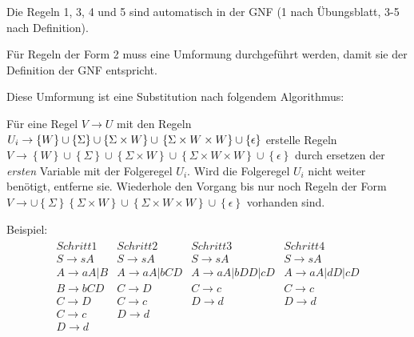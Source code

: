 \documentclass{article}
\begin{document}
Die Regeln 1, 3, 4 und 5 sind automatisch in der GNF (1 nach Übungsblatt, 3-5 nach Definition).

Für Regeln der Form 2 muss eine Umformung durchgeführt werden, damit sie der Definition der GNF entspricht.

Diese Umformung ist eine Substitution nach folgendem Algorithmus:

Für eine Regel $V \rightarrow U$ mit den Regeln $U_i \rightarrow \left\{W\right\}\cup\left\{\Sigma\right\}\cup\left\{\Sigma\times W\right\}\cup\\\left\{\Sigma \times W \times W\right\}\cup\left\{\epsilon\right\}$ erstelle Regeln $V \rightarrow \left\{W\right\}\cup\left\{\Sigma\right\}\cup\left\{\Sigma\times W\right\}\cup\left\{\Sigma \times W \times W\right\}\cup\left\{\epsilon\right\}$ durch ersetzen der \textit{ersten} Variable mit der Folgeregel $U_i$. Wird die Folgeregel $U_i$ nicht weiter benötigt, entferne sie.
Wiederhole den Vorgang bis nur noch Regeln der Form $V \rightarrow \cup\left\{\Sigma\right\}\left\{\Sigma\times W\right\}\cup\left\{\Sigma \times W \times W\right\}\cup\left\{\epsilon\right\}$ vorhanden sind.

Beispiel:
\begin{align*}
\begin{array}{llll}
Schritt 1 & Schritt 2 & Schritt 3 & Schritt 4 \\
\hline
S \rightarrow sA     & S \rightarrow sA       & S \rightarrow sA            & S \rightarrow sA \\
A \rightarrow aA | B & A \rightarrow aA | bCD & A \rightarrow aA | bDD | cD & A \rightarrow aA | dD | cD \\
B \rightarrow bCD    & C \rightarrow D        & C \rightarrow c             & C \rightarrow c \\
C \rightarrow D      & C \rightarrow c        & D \rightarrow d             & D \rightarrow d \\
C \rightarrow c      & D \rightarrow d        &                             & \\
D \rightarrow d      &                        &                             & \\
\end{array}
\end{align*}
\end{document}
